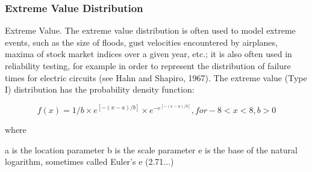 \documentclass[MAIN.tex]{subfiles}
\begin{document}
\begin{frame}
	\frametitle{Extreme Value Distribution} Extreme Value. The extreme value distribution is often used to model extreme events, such as the size of floods, gust velocities encountered by airplanes, maxima of stock market indices over a given year, etc.; it is also often used in reliability testing, for example in order to represent the distribution of failure times for electric circuits (see Hahn and Shapiro, 1967). The extreme value (Type I) distribution has the probability density function:
	
	\[f(x) = 1/b \times e^{[-(x-a)/b]} \times e^{-e^{[-(x-a)/b]}},    for -8 < x < 8, b > 0\]
	
	where
	
	a	is the location parameter
	b	is the scale parameter
	e	is the base of the natural logarithm, sometimes called Euler's e (2.71...)
\end{frame}
\end{document}
